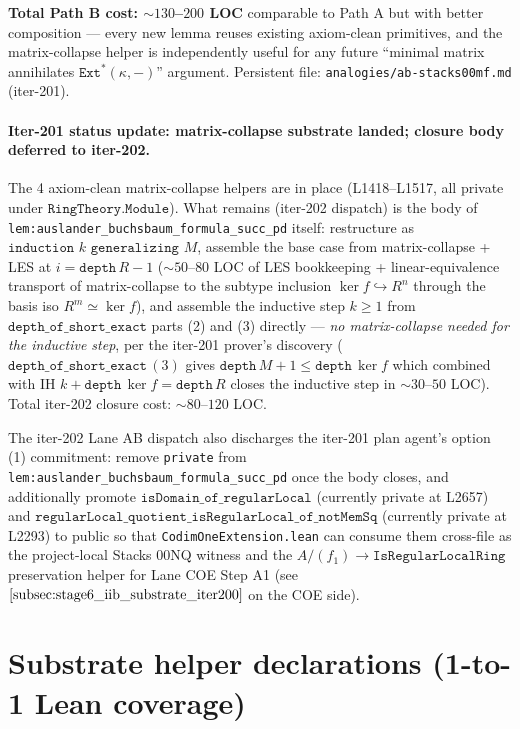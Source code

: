 \textbf{Total Path B cost: \(\sim 130\)--\(200\) LOC} comparable to
Path A but with better composition --- every new lemma reuses
existing axiom-clean primitives, and the matrix-collapse helper is
independently useful for any future ``minimal matrix annihilates
\(\texttt{Ext}^*(\kappa, -)\)'' argument. Persistent file:
\texttt{analogies/ab-stacks00mf.md} (iter-201).

\paragraph{Iter-201 status update: matrix-collapse substrate landed;
closure body deferred to iter-202.} The 4 axiom-clean matrix-collapse
helpers are in place (L1418--L1517, all private under
\(\texttt{RingTheory.Module}\)). What remains (iter-202 dispatch) is
the body of \texttt{lem:auslander_buchsbaum_formula_succ_pd} itself:
restructure as \(\texttt{induction } k \texttt{ generalizing } M\),
assemble the base case from matrix-collapse + LES at
\(i = \texttt{depth}\,R - 1\) (\(\sim 50\)--\(80\) LOC of LES
bookkeeping + linear-equivalence transport of matrix-collapse to the
subtype inclusion \(\ker f \hookrightarrow R^n\) through the basis
iso \(R^m \simeq \ker f\)), and assemble the inductive step
\(k \geq 1\) from
\(\texttt{depth\_of\_short\_exact}\) parts (2) and (3) directly ---
\emph{no matrix-collapse needed for the inductive step}, per the
iter-201 prover's discovery (\(\texttt{depth\_of\_short\_exact}\,(3)\)
gives \(\texttt{depth}\,M + 1 \leq \texttt{depth}\,\ker f\) which
combined with IH \(k + \texttt{depth}\,\ker f = \texttt{depth}\,R\)
closes the inductive step in \(\sim 30\)--\(50\) LOC). Total iter-202
closure cost: \(\sim 80\)--\(120\) LOC.

The iter-202 Lane AB dispatch also discharges the iter-201 plan
agent's option (1) commitment: remove \texttt{private} from
\texttt{lem:auslander_buchsbaum_formula_succ_pd} once the body closes,
and additionally promote \(\texttt{isDomain\_of\_regularLocal}\)
(currently private at L2657) and
\(\texttt{regularLocal\_quotient\_isRegularLocal\_of\_notMemSq}\)
(currently private at L2293) to public so that
\texttt{CodimOneExtension.lean} can consume them cross-file as the
project-local Stacks 00NQ witness and the
\(A / (f_1) \to \texttt{IsRegularLocalRing}\) preservation helper for
Lane COE Step A1 (see \(\cref{subsec:stage6_iib_substrate_iter200}\)
on the COE side).

\section{Substrate helper declarations (1-to-1 Lean coverage)}
\label{sec:ab_substrate_helpers}

